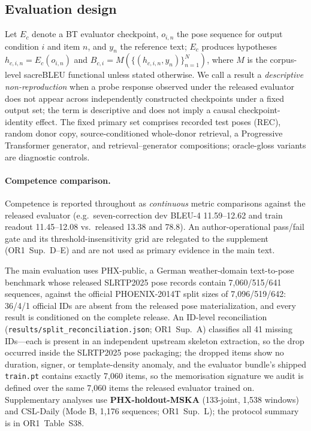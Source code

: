 \documentclass[pdflatex,sn-chicago]{sn-jnl}
\begin{document}
\subsection{Evaluation design}
Let $E_c$ denote a BT evaluator checkpoint, $o_{i,n}$ the pose sequence for output condition $i$ and item $n$, and $y_n$ the reference text; $E_c$ produces hypotheses $h_{c,i,n}=E_c(o_{i,n})$ and $B_{c,i}=M(\{(h_{c,i,n},y_n)\}_{n=1}^{N})$, where $M$ is the corpus-level sacreBLEU functional unless stated otherwise. We call a result a \emph{descriptive non-reproduction} when a probe response observed under the released evaluator does not appear across independently constructed checkpoints under a fixed output set; the term is descriptive and does not imply a causal checkpoint-identity effect. The fixed primary set comprises recorded test poses (REC), random donor copy, source-conditioned whole-donor retrieval, a Progressive Transformer generator, and retrieval--generator compositions; oracle-gloss variants are diagnostic controls.

\paragraph{Competence comparison.}
\label{sec:sufficiency_def}
Competence is reported throughout as \emph{continuous} metric comparisons against the released evaluator (e.g.\ seven-correction dev BLEU-4 11.59--12.62 and train readout 11.45--12.08 vs.\ released 13.38 and 78.8). An author-operational pass/fail gate and its threshold-insensitivity grid are relegated to the supplement (OR1~Sup.~D--E) and are not used as primary evidence in the main text.

The main evaluation uses PHX-public, a German weather-domain text-to-pose benchmark whose released SLRTP2025 pose records contain 7,060/515/641 sequences, against the official PHOENIX-2014T split sizes of 7,096/519/642: 36/4/1 official IDs are absent from the released pose materialization, and every result is conditioned on the complete release. An ID-level reconciliation (\texttt{results/split\_reconciliation.json}; OR1~Sup.~A) classifies all 41 missing IDs---each is present in an independent upstream skeleton extraction, so the drop occurred inside the SLRTP2025 pose packaging; the dropped items show no duration, signer, or template-density anomaly, and the evaluator bundle's shipped \texttt{train.pt} contains exactly 7,060 items, so the memorisation signature we audit is defined over the same 7,060 items the released evaluator trained on. Supplementary analyses use \textbf{PHX-holdout-MSKA} (133-joint, 1,538 windows) and CSL-Daily (Mode B, 1,176 sequences; OR1~Sup.~L); the protocol summary is in OR1~Table~S38.
\end{document}
